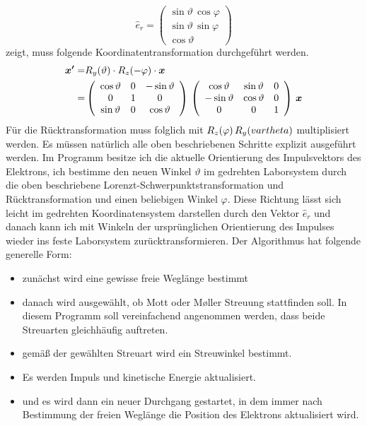 \documentclass[12pt]{article}
\begin{document}
$$\hat{e}_r=\left(\begin{array}{c}\sin\vartheta\,\cos\varphi\\\sin\vartheta\,\sin\varphi\\\cos\vartheta\end{array}\right)$$
zeigt, muss folgende Koordinatentransformation durchgeführt werden.
\begin{align*}
    \bm{x'}=&R_y(\vartheta)\cdot{R_z}(-\varphi)\cdot\bm{x}\\
    =&\left(\begin{array}{c c c}\cos\vartheta&0&-\sin\vartheta\\
        0&1&0\\
        \sin\vartheta&0&\cos\vartheta
    \end{array}\right)\,\left(\begin{array}{c c c}\cos\vartheta&\sin\vartheta&0\\
        -\sin\vartheta&\cos\vartheta&0\\
        0&0&1
    \end{array}\right)\,\bm{x}
\end{align*}
Für die Rücktransformation muss folglich mit $R_z(\varphi)\,R_y(\-vartheta)$ multiplisiert werden. Es müssen natürlich alle oben beschriebenen Schritte explizit ausgeführt werden. Im Programm besitze ich die aktuelle Orientierung des Impulsvektors des Elektrons, ich bestimme den neuen Winkel $\vartheta$ im gedrehten Laborsystem durch die oben beschriebene Lorenzt-Schwerpunktstransformation und Rücktransformation und einen beliebigen Winkel $\varphi$. Diese Richtung lässt sich leicht im gedrehten Koordinatensystem darstellen durch den Vektor $\hat{e}_r$ und danach kann ich mit Winkeln der ursprünglichen Orientierung des Impulses wieder ins feste Laborsystem zurücktransformieren.
\newline\newline
Der Algorithmus hat folgende generelle Form:
\begin{itemize}
    \item zunächst wird eine gewisse freie Weglänge bestimmt
    \item danach wird ausgewählt, ob Mott oder Møller Streuung stattfinden soll. In diesem Programm soll vereinfachend angenommen werden, dass beide Streuarten gleichhäufig auftreten.
    \item gemäß der gewählten Streuart wird ein Streuwinkel bestimmt.
    \item Es werden Impuls und kinetische Energie aktualisiert.
    \item und es wird dann ein neuer Durchgang gestartet, in dem immer nach Bestimmung der freien Weglänge die Position des Elektrons aktualisiert wird.
\end{itemize}
\end{document}
